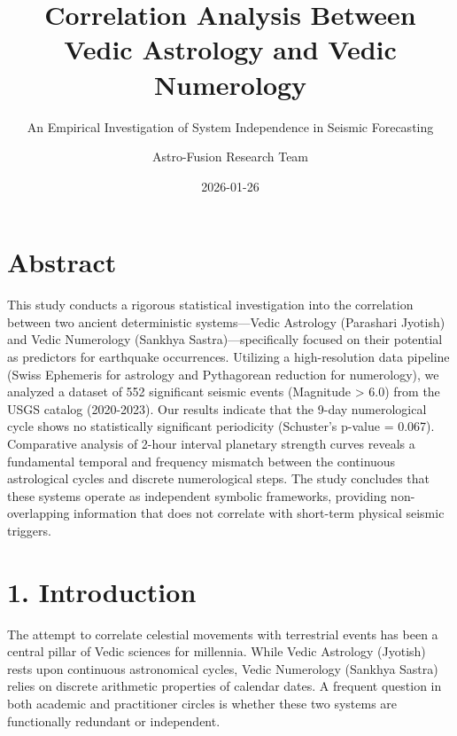 \documentclass[
  american,
  11pt,
  oneside,
  openany]{scrbook}
\title{Correlation Analysis Between Vedic Astrology and Vedic
Numerology}
\subtitle{An Empirical Investigation of System Independence in Seismic
Forecasting}
\author{Astro-Fusion Research Team}
\date{2026-01-26}
\begin{document}
\frontmatter
\maketitle




\mainmatter
\chapter{Abstract}\label{abstract}

This study conducts a rigorous statistical investigation into the
correlation between two ancient deterministic systems---Vedic Astrology
(Parashari Jyotish) and Vedic Numerology (Sankhya Sastra)---specifically
focused on their potential as predictors for earthquake occurrences.
Utilizing a high-resolution data pipeline (Swiss Ephemeris for astrology
and Pythagorean reduction for numerology), we analyzed a dataset of 552
significant seismic events (Magnitude \textgreater{} 6.0) from the USGS
catalog (2020-2023). Our results indicate that the 9-day numerological
cycle shows no statistically significant periodicity (Schuster's p-value
= 0.067). Comparative analysis of 2-hour interval planetary strength
curves reveals a fundamental temporal and frequency mismatch between the
continuous astrological cycles and discrete numerological steps. The
study concludes that these systems operate as independent symbolic
frameworks, providing non-overlapping information that does not
correlate with short-term physical seismic triggers.

\chapter{1. Introduction}\label{introduction}

The attempt to correlate celestial movements with terrestrial events has
been a central pillar of Vedic sciences for millennia. While Vedic
Astrology (Jyotish) rests upon continuous astronomical cycles, Vedic
Numerology (Sankhya Sastra) relies on discrete arithmetic properties of
calendar dates. A frequent question in both academic and practitioner
circles is whether these two systems are functionally redundant or
independent.
\end{document}
